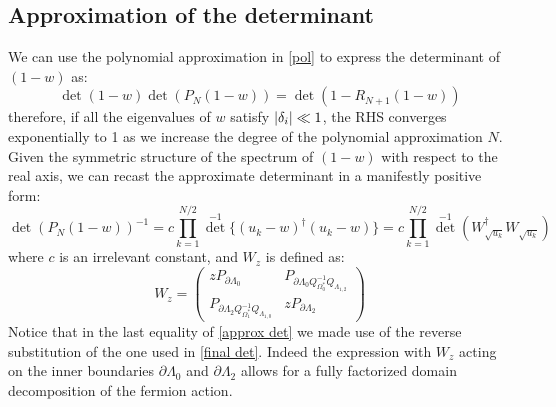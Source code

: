  \subsection{Approximation of the determinant}
 We can use the polynomial approximation in \eqref{pol} to express the determinant of $(1 - w)$ as:
 \begin{equation} \label{det approximation}
     \det (1 - w) \det (P_N(1 - w)) = \det (1 - R_{N+1} (1 - w))
 \end{equation}
 therefore, if all the eigenvalues of $w$ satisfy $\abs{\delta_i} \ll 1$, the RHS converges exponentially to 1 as we increase the degree of the polynomial approximation $N$. Given the symmetric structure of the spectrum of $(1 - w)$ with respect to the real axis, we can recast the approximate determinant in a manifestly positive form:
 \begin{equation} \label{approx det}
     \det \left( P_N(1 - w) \right)^{-1} = c \prod_{k = 1}^{N/2} \det^{-1} \big\{ (u_k - w)^{\dagger} (u_k - w) \big\} = c \prod_{k = 1}^{N/2} \det^{-1} \left( W^\dagger_{\sqrt{u_k}} W_{\sqrt{u_k}} \right)
 \end{equation}
 where $c$ is an irrelevant constant, and $W_z$ is defined as:
 \begin{equation}
     W_z = \begin{pmatrix}
         z P_{\partial \Lambda_0} & P_{\partial \Lambda_0 Q_{\Omega_0^*}^{-1} Q_{\Lambda_{1,2}}} \\ 
         P_{\partial \Lambda_2 Q_{\Omega_1^*}^{-1} Q_{\Lambda_{1,0}}} & z P_{\partial \Lambda_2}
     \end{pmatrix}
 \end{equation}
 Notice that in the last equality of \eqref{approx det} we made use of the reverse substitution of the one used in \eqref{final det}.
Indeed the expression with $W_z$ acting on the inner boundaries $\partial \Lambda_0$ and $\partial \Lambda_2$ allows for a fully factorized domain decomposition of the fermion action.
\newpage

